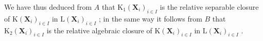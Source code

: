 We have thus deduced from \(A\) that \(\mathrm{K}_1(\mathbf{X}_i)_{i\in I}\) is the relative separable closure of \(\mathrm{K}(\mathbf{X}_i)_{i\in I}\) in \(\mathrm{L}(\mathbf{X}_i)_{i\in I}\) ; in the same way it follows from \(B\) that \(\mathrm{K}_2(\mathbf{X}_i)_{i\in I}\) is the relative algebraic closure of \(\mathrm{K}(\mathbf{X}_i)_{i\in I}\) in \(\mathrm{L}(\mathbf{X}_i)_{i\in I}\) .

